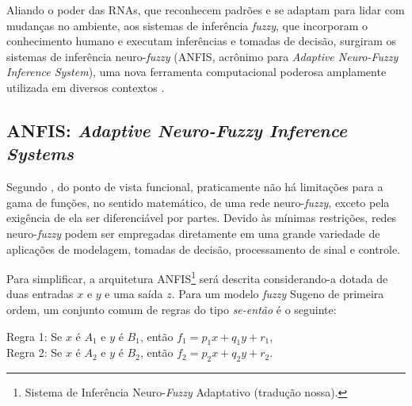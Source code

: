 Aliando o poder das RNAs, que reconhecem padrões e se adaptam para lidar com mudanças no ambiente, aos sistemas de inferência \textit{fuzzy}, que incorporam o conhecimento humano e executam inferências e tomadas de decisão, surgiram os sistemas de inferência neuro-\textit{fuzzy} (ANFIS, acrônimo para \textit{Adaptive Neuro-Fuzzy Inference System}), uma nova ferramenta computacional poderosa amplamente utilizada em diversos contextos \cite[p.~1]{Jang1997}.

\subsection{ANFIS: \textit{Adaptive Neuro-Fuzzy Inference Systems}}
Segundo , do ponto de vista funcional, praticamente não há limitações para a gama de funções, no sentido matemático, de uma rede neuro-\textit{fuzzy}, exceto pela exigência de ela ser diferenciável por partes. Devido às mínimas restrições, redes neuro-\textit{fuzzy} podem ser empregadas diretamente em uma grande variedade de aplicações de modelagem, tomadas de decisão, processamento de sinal e controle.

Para simplificar, a arquitetura ANFIS\footnote{Sistema de Inferência Neuro-\textit{Fuzzy} Adaptativo (tradução nossa).} será descrita considerando-a dotada de duas entradas $x$ e $y$ e uma saída $z$. Para um modelo \textit{fuzzy} Sugeno de primeira ordem, um conjunto comum de regras do tipo \textit{se-então} é o seguinte:

\begin{center}
    Regra 1: Se $x$ é $A_1$ e $y$ é $B_1$, então $f_1 = p_1x + q_1y + r_1$,\\
    Regra 2: Se $x$ é $A_2$ e $y$ é $B_2$, então $f_2 = p_2x + q_2y + r_2$. 
\end{center}

